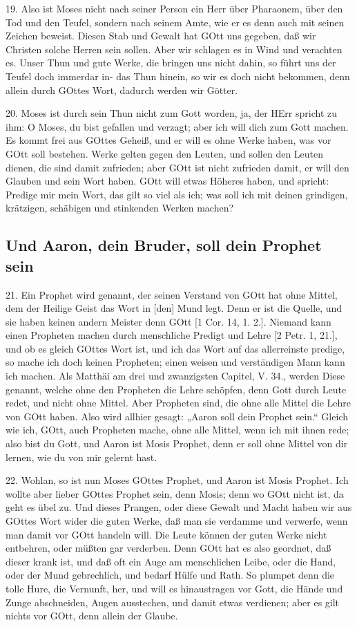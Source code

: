 19. Also ist Moses nicht nach seiner Person ein Herr über Pharaonem, über den Tod und den Teufel, sondern nach seinem Amte, wie er es denn auch mit seinen Zeichen beweist. Diesen Stab und Gewalt hat GOtt uns gegeben, daß wir Christen solche Herren sein sollen. Aber wir schlagen es in Wind und verachten es. Unser Thun und gute Werke, die bringen uns nicht dahin, so führt uns der Teufel doch immerdar in- das Thun hinein, so wir es doch nicht bekommen, denn allein durch GOttes Wort, dadurch werden wir Götter.

20. Moses ist durch sein Thun nicht zum Gott worden, ja, der HErr spricht zu ihm: O Moses, du bist gefallen und verzagt; aber ich will dich zum Gott machen. Es kommt frei aus GOttes Geheiß, und er will es ohne Werke haben, was vor GOtt soll bestehen. Werke gelten gegen den Leuten, und sollen den Leuten dienen, die sind damit zufrieden; aber GOtt ist nicht zufrieden damit, er will den Glauben und sein Wort haben. GOtt will etwas Höheres haben, und spricht: Predige mir mein Wort, das gilt so viel als ich; was soll ich mit deinen grindigen, krätzigen, schäbigen und stinkenden Werken machen?

\subsection{Und Aaron, dein Bruder, soll dein Prophet sein}

21. Ein Prophet wird genannt, der seinen Verstand von GOtt hat ohne Mittel, dem der Heilige Geist das Wort in [den] Mund legt. Denn er ist die Quelle, und sie haben keinen andern Meister denn GOtt [1 Cor. 14, 1. 2.]. Niemand kann einen Propheten machen durch menschliche Predigt und Lehre [2 Petr. 1, 21.], und ob es gleich GOttes Wort ist, und ich das Wort auf das allerreinste predige, so mache ich doch keinen Propheten; einen weisen und verständigen Mann kann ich machen. Als Matthäi am drei und zwanzigsten Capitel, V. 34., werden Diese genannt, welche ohne den Propheten die Lehre schöpfen, denn Gott durch Leute redet, und nicht ohne Mittel. Aber Propheten sind, die ohne alle Mittel die Lehre von GOtt haben. Also wird allhier gesagt: „Aaron soll dein Prophet sein.“ Gleich wie ich, GOtt, auch Propheten mache, ohne alle Mittel, wenn ich mit ihnen rede; also bist du Gott, und Aaron ist Mosis Prophet, denn er soll ohne Mittel von dir lernen, wie du von mir gelernt hast.

22. Wohlan, so ist nun Moses GOttes Prophet, und Aaron ist Mosis Prophet. Ich wollte aber lieber GOttes Prophet sein, denn Mosis; denn wo GOtt nicht ist, da geht es übel zu. Und dieses Prangen, oder diese Gewalt und Macht haben wir aus GOttes Wort wider die guten Werke, daß man sie verdamme und verwerfe, wenn man damit vor GOtt handeln will. Die Leute können der guten Werke nicht entbehren, oder müßten gar verderben. Denn GOtt hat es also geordnet, daß dieser krank ist, und daß oft ein Auge am menschlichen Leibe, oder die Hand, oder der Mund gebrechlich, und bedarf Hülfe und Rath. So plumpet denn die tolle Hure, die Vernunft, her, und will es hinaustragen vor Gott, die Hände und Zunge abschneiden, Augen ausstechen, und damit etwas verdienen; aber es gilt nichts vor GOtt, denn allein der Glaube.

